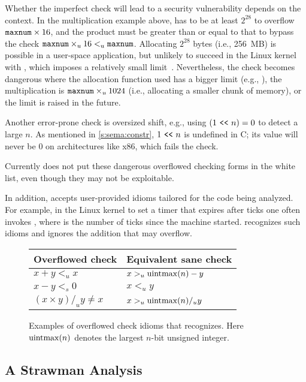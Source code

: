 Whether the imperfect check will lead to a security vulnerability
depends on the context.  In the multiplication example above,
 has to be at least $2^{28}$ to overflow $\texttt{maxnum}
\times 16$, and the product must be greater than or equal to that
to bypass the check $\texttt{maxnum} \times_u 16 <_u \texttt{maxnum}$.
Allocating $2^{28}$ bytes (i.e., 256~MB) is possible in a user-space
application, but unlikely to succeed in the Linux kernel with
, which imposes a relatively small
limit~\cite[\chapterautorefname~8]{ldd3}.  Nevertheless, the check
becomes dangerous where the allocation function used has a bigger
limit (e.g., ), the multiplication is $\texttt{maxnum}
\times_u 1024$ (i.e., allocating a smaller chunk of memory), or the
 limit is raised in the future.

Another error-prone check is oversized shift, e.g., using $(1 \ \texttt{<}\texttt{<}\ 
n) = 0$ to detect a large $n$.  As mentioned in \autoref{s:sema:constr},
${1 \ \texttt{<}\texttt{<}\  n}$ is undefined in C; its value will never be 0 on
architectures like x86, which fails the check.

Currently \sys does not put these dangerous overflowed checking
forms in the white list, even though they may not be exploitable.

In addition, \sys accepts user-provided idioms tailored for the
code being analyzed.  For example, in the Linux kernel to set a
timer that expires after  ticks one often invokes
, where  is the
number of ticks since the machine started.  \sys recognizes
such idioms and ignores the addition  that may
overflow.

\begin{figure}
\centering
\begin{tabular}{ll}
\toprule
Overflowed check & Equivalent sane check \\ \midrule
$x + y <_u x$ & $x >_u \operatorname{uintmax}(n) - y$ \\
$x - y <_s 0$ & $x <_u y$ \\
$(x \times y) /_u y \neq x$ & $x >_u \operatorname{uintmax}(n) /_u y$   \\
\bottomrule
\end{tabular}
\caption{Examples of overflowed check idioms that \sys recognizes.
Here $\operatorname{uintmax}(n)$ denotes the largest $n$-bit unsigned integer.}
\label{f:whitelist}
\end{figure}


\subsection{A Strawman Analysis}

